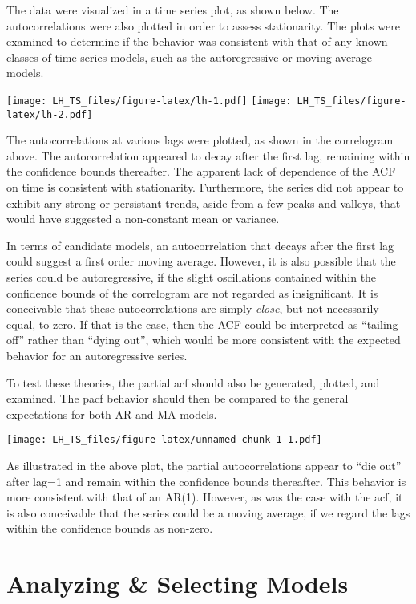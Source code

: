 \documentclass[]{article}
\begin{document}
The data were visualized in a time series plot, as shown below. The
autocorrelations were also plotted in order to assess stationarity. The
plots were examined to determine if the behavior was consistent with
that of any known classes of time series models, such as the
autoregressive or moving average models.

\texttt{[image: LH\_TS\_files/figure-latex/lh-1.pdf]}
\texttt{[image: LH\_TS\_files/figure-latex/lh-2.pdf]}

The autocorrelations at various lags were plotted, as shown in the
correlogram above. The autocorrelation appeared to decay after the first
lag, remaining within the confidence bounds thereafter. The apparent
lack of dependence of the ACF on time is consistent with stationarity.
Furthermore, the series did not appear to exhibit any strong or
persistant trends, aside from a few peaks and valleys, that would have
suggested a non-constant mean or variance.

In terms of candidate models, an autocorrelation that decays after the
first lag could suggest a first order moving average. However, it is
also possible that the series could be autoregressive, if the slight
oscillations contained within the confidence bounds of the correlogram
are not regarded as insignificant. It is conceivable that these
autocorrelations are simply \emph{close}, but not necessarily equal, to
zero. If that is the case, then the ACF could be interpreted as
``tailing off'' rather than ``dying out'', which would be more
consistent with the expected behavior for an autoregressive series.

To test these theories, the partial acf should also be generated,
plotted, and examined. The pacf behavior should then be compared to the
general expectations for both AR and MA models.

\texttt{[image: LH\_TS\_files/figure-latex/unnamed-chunk-1-1.pdf]}

As illustrated in the above plot, the partial autocorrelations appear to
``die out'' after lag=1 and remain within the confidence bounds
thereafter. This behavior is more consistent with that of an AR(1).
However, as was the case with the acf, it is also conceivable that the
series could be a moving average, if we regard the lags within the
confidence bounds as non-zero.

\section{Analyzing \& Selecting
Models}\label{analyzing-selecting-models}
\end{document}
